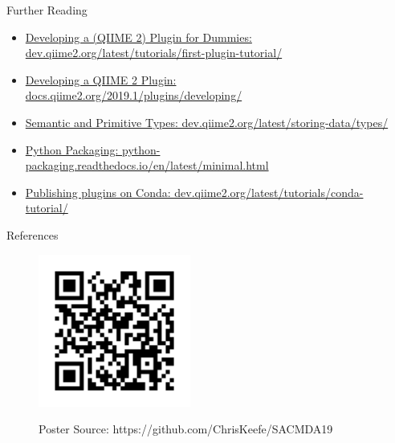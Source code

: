 \documentclass[final]{beamer}
\newlength{\sepwidth}
\newlength{\colwidth}
\newcommand{\separatorcolumn}{\begin{column}{\sepwidth}\end{column}}
\begin{document}
\begin{frame}[t]
\begin{columns}[t]
\begin{column}{\colwidth}
  \begin{block}{Further Reading}
    \begin{itemize}
      \item \href{https://dev.qiime2.org/latest/tutorials/first-plugin-tutorial/}{Developing a (QIIME 2) Plugin for Dummies: dev.qiime2.org/latest/tutorials/first-plugin-tutorial/}
      \item \href{https://docs.qiime2.org/2019.1/plugins/developing/}{Developing a QIIME 2 Plugin: docs.qiime2.org/2019.1/plugins/developing/}
      \item \href{https://dev.qiime2.org/latest/storing-data/types/}{Semantic and Primitive Types: dev.qiime2.org/latest/storing-data/types/}
      \item \href{https://python-packaging.readthedocs.io/en/latest/minimal.html}{Python Packaging: python-packaging.readthedocs.io/en/latest/minimal.html}
      \item \href{https://dev.qiime2.org/latest/tutorials/conda-tutorial/}{Publishing plugins on Conda: dev.qiime2.org/latest/tutorials/conda-tutorial/}
    \end{itemize}
  \end{block}

  \begin{block}{References}
    \nocite{*}
    
  \end{block}

  \begin{figure}
    \begin{minipage}[c]{\textwidth}
      \hfill
      \includegraphics[height=5cm]{assets/repo}
    \end{minipage}
    \begin{minipage}[c]{\textwidth}
      \hfill
      Poster Source: https://github.com/ChrisKeefe/SACMDA19
    \end{minipage}
  \end{figure}

\end{column}

\separatorcolumn
\end{columns}
\end{frame}
\end{document}

